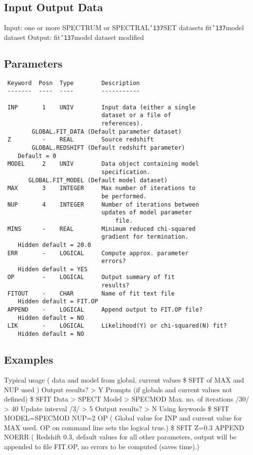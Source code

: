 \documentclass{book}
\renewcommand{\_}{{\tt\char'137}}     %
\begin{document}
\subsection{Input Output Data}
Input: one or more SPECTRUM or SPECTRAL\_SET datasets
fit\_model dataset
Output: fit\_model dataset modified
\subsection{Parameters}
\begin{verbatim}
 Keyword  Posn  Type        Description
 -------  ----  ----        -----------

 INP       1    UNIV        Input data (either a single
                            dataset or a file of
                            references).
        GLOBAL.FIT_DATA (Default parameter dataset)
 Z         -    REAL        Source redshift
        GLOBAL.REDSHIFT (Default redshift parameter)
    Default = 0
 MODEL     2    UNIV        Data object containing model
                            specification.
       GLOBAL.FIT_MODEL (Default model dataset)
 MAX       3    INTEGER     Max number of iterations to
                            be performed.
 NUP       4    INTEGER     Number of iterations between
                            updates of model parameter
                                file.
 MINS      -    REAL        Minimum reduced chi-squared
                            gradient for termination.
    Hidden default = 20.0
 ERR       -    LOGICAL     Compute approx. parameter
                            errors?
    Hidden default = YES
 OP        -    LOGICAL     Output summary of fit
                            results?
 FITOUT    -    CHAR        Name of fit text file
    Hidden default = FIT.OP
 APPEND    -    LOGICAL     Append output to FIT.OP file?
    Hidden default = NO
 LIK       -    LOGICAL     Likelihood(Y) or chi-squared(N) fit?
    Hidden default = NO

\end{verbatim}\subsection{Examples}
Typical usage
( data and model from global, current values
\$ SFIT of MAX and NUP used )
Output results? > Y
Prompts (if globals and current values not defined)
\$ SFIT
Data > SPECT
Model > SPECMOD
Max. no. of iterations /30/ > 40
Update interval /3/ > 5
Output results? > N
Using keywords
\$ SFIT MODEL=SPECMOD NUP=2 OP
( Global value for INP and current value for MAX used.
OP on command line sets the logical true.)
\$ SFIT Z=0.3 APPEND NOERR
( Redshift 0.3, default values for all other parameters,
output will be appended to file FIT.OP, no errors to be
computed (saves time).)
\end{document}
